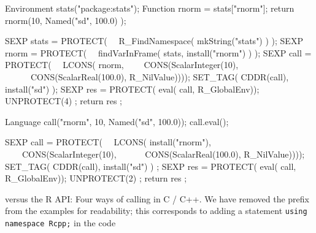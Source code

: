 \begin{table*}[t]
  \begin{minipage}[t]{0.465\linewidth}
    \begin{example}
Environment stats("package:stats");
Function rnorm = stats["rnorm"];
return rnorm(10, Named("sd", 100.0) );
    \end{example}
  \end{minipage}
  \begin{minipage}{0.06\linewidth}
    \phantom{XXX}
  \end{minipage}
  \begin{minipage}[t]{0.465\linewidth}
    \begin{example}
SEXP stats = PROTECT( 
\ \ R_FindNamespace( mkString("stats") ) );
SEXP rnorm = PROTECT( 
\ \ findVarInFrame( stats, install("rnorm") ) );
SEXP call  = PROTECT( 
\ \ LCONS( rnorm, 
\ \ \ \ CONS(ScalarInteger(10), 
\ \ \ \ \ \ CONS(ScalarReal(100.0), R_NilValue))));
SET_TAG( CDDR(call), install("sd") );
SEXP res = PROTECT( eval( call, R_GlobalEnv));
UNPROTECT(4) ;
return res ;
    \end{example}
  \end{minipage}

  \begin{minipage}[t]{0.465\linewidth}
    \begin{example}
Language call("rnorm", 10, Named("sd", 100.0));
call.eval();
    \end{example}
  \end{minipage}
  \begin{minipage}{0.06\linewidth}
    \phantom{XXX}
  \end{minipage}
  \begin{minipage}[t]{0.465\linewidth}
    \begin{example}
SEXP call  = PROTECT( 
\ \ LCONS( install("rnorm"), 
\ \ \ \ CONS(ScalarInteger(10), 
\ \ \ \ \ \ CONS(ScalarReal(100.0), R_NilValue))));
SET_TAG( CDDR(call), install("sd") ) ;
SEXP res = PROTECT( eval( call, R_GlobalEnv));
UNPROTECT(2) ;
return res ;
    \end{example}
  \end{minipage}
  \caption{ versus the R API: Four ways of calling  in C / C++. 
  We have removed the  prefix from the
  examples for readability; this corresponds to adding a statement
  \texttt{using namespace Rcpp;} in the code}
  \label{fig:rnormCode}
\end{table*}

